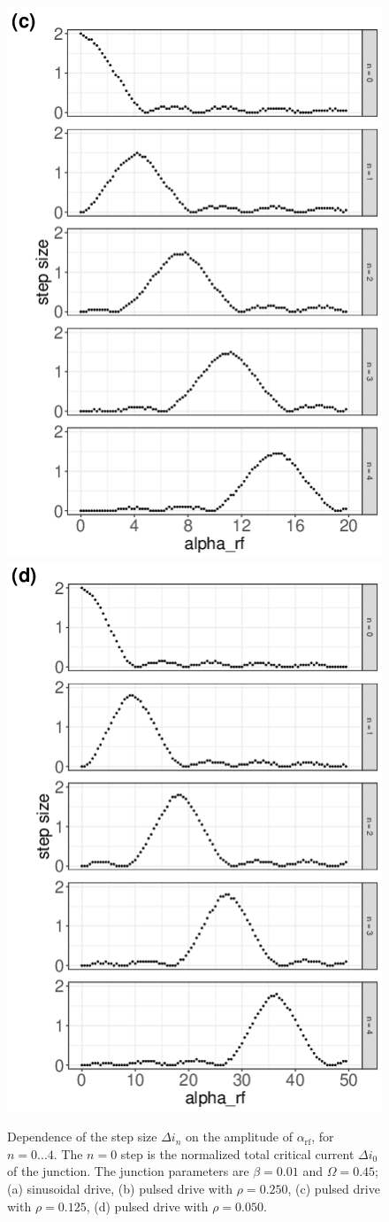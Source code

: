 \begin{figure}[!p]
	\centering
	\includegraphics[width = 0.45 \textwidth]{images/PULS0125.png}
	\includegraphics[width = 0.45 \textwidth]{images/PULS0050.png}
	\caption{Dependence of the step size $\Delta i_n$ on the amplitude of $\alpha_\mathrm{rf}$, for $n = 0. . . 4$. The $n = 0$ step is the normalized total critical current $\Delta i_0$ of the junction. The junction parameters are $\beta = 0. 01$ and $\Omega = 0. 45$; (a) sinusoidal drive, (b) pulsed drive with $\rho = 0. 250$, (c) pulsed drive with $\rho = 0. 125$, (d) pulsed drive with $\rho = 0. 050$.}
	\label{fig:step-width}
\end{figure}

